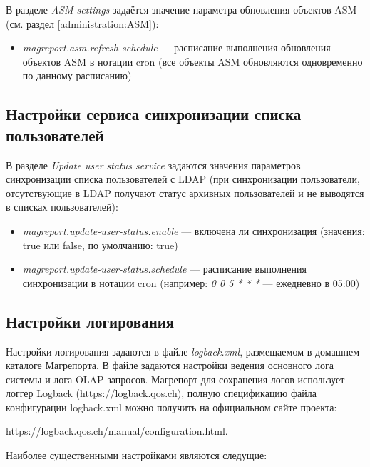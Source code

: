 \documentclass[../user-manual.tex]{subfiles}
\begin{document}
	В разделе \textit{ASM settings} задаётся значение параметра обновления объектов ASM (см. раздел \ref{administration:ASM}):
	
	\begin{itemize}
		\item \textit{magreport.asm.refresh-schedule} --- расписание выполнения обновления объектов ASM в нотации cron (все объекты ASM обновляются одновременно по данному расписанию)
	\end{itemize}
	
	\subsection{Настройки сервиса синхронизации списка пользователей}
	
	В разделе \textit{Update user status service} задаются значения параметров синхронизации списка пользователей с LDAP (при синхронизации пользователи, отсутствующие в LDAP получают статус архивных пользователей и не выводятся в списках пользователей):
	
	\begin{itemize}
		\item \textit{magreport.update-user-status.enable} --- включена ли синхронизация (значения: true или false, по умолчанию: true)
		
		\item \textit{magreport.update-user-status.schedule} --- расписание выполнения синхронизации в нотации cron (например: \textit{0 0 5 * * *} --- ежедневно в 05:00)
	\end{itemize}

	\subsection{Настройки логирования}\label{subsection:logging}
	
	Настройки логирования задаются в файле \textit{logback.xml}, размещаемом в домашнем каталоге Магрепорта. В файле задаются настройки ведения основного лога системы и лога OLAP-запросов. Магрепорт для сохранения логов использует логгер Logback (\href{https://logback.qos.ch}{https://logback.qos.ch}), полную спецификацию файла конфигурации logback.xml можно получить на официальном сайте проекта:
	\begin{center}
	\href{https://logback.qos.ch/manual/configuration.html}{https://logback.qos.ch/manual/configuration.html}.	\end{center}
	
	Наиболее существенными настройками являются следущие:
	
\end{document}
